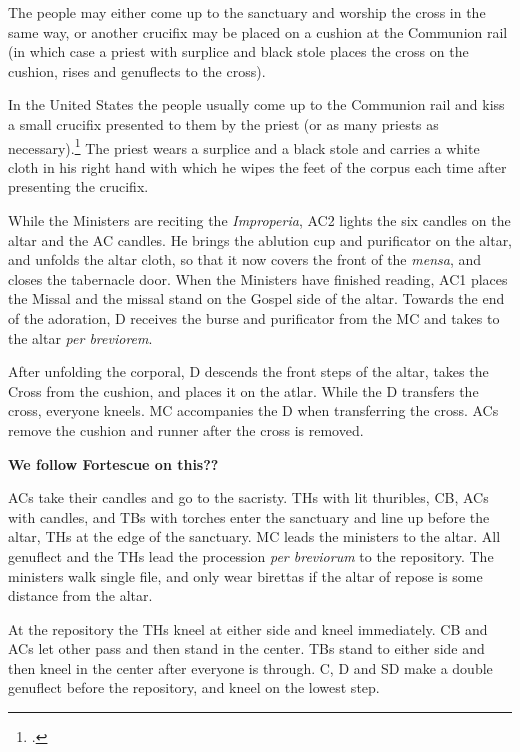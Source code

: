 {    \rubric The people may either come up to the sanctuary and worship the
    cross in the same way, or another crucifix may be placed on a cushion at
    the Communion rail (in which case a priest with surplice and black stole
    places the cross on the cushion, rises and genuflects to the cross).

    \rubric In the United States the people usually come up to the Communion
    rail and kiss a small crucifix presented to them by the priest (or as many
    priests as necessary).\footcite[][]{hweekls} The priest wears a surplice
    and a black stole and carries a white cloth in his right hand with which he
    wipes the feet of the corpus each time after presenting the crucifix.

    \rubric While the Ministers are reciting the \textit{Improperia}, AC2
    lights the six candles on the altar and the AC candles. He brings the
    ablution cup and purificator on the altar, and unfolds the altar cloth, so
    that it now covers the front of the \textit{mensa}, and closes the
    tabernacle door. When the Ministers have finished reading, AC1 places the
    Missal and the missal stand on the Gospel side of the altar. Towards the
    end of the adoration, D receives the burse and purificator from the MC and
    takes to the altar \textit{per breviorem}.

    \rubric After unfolding the corporal, D descends the front steps of the
    altar, takes the Cross from the cushion, and places it on the atlar. While
    the D transfers the cross, everyone kneels. MC accompanies the D when
    transferring the cross. ACs remove the cushion and runner after the cross
    is removed.

    \textbf{We follow Fortescue on this??}

    \rubric ACs take their candles and go to the sacristy. THs with lit
    thuribles, CB, ACs with candles, and TBs with torches enter the sanctuary
    and line up before the altar, THs at the edge of the sanctuary. MC leads
    the ministers to the altar. All genuflect and the THs lead the procession
    \textit{per breviorum} to the repository. The ministers walk single file,
    and only wear birettas if the altar of repose is some distance from the
    altar.

    \rubric At the repository the THs kneel at either side and kneel
    immediately. CB and ACs let other pass and then stand in the center. TBs
    stand to either side and then kneel in the center after everyone is
    through. C, D and SD make a double genuflect before the repository, and
    kneel on the lowest step.

}
